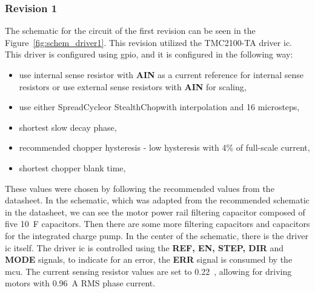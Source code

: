 \subsubsection{Revision 1}
The schematic for the circuit of the first revision can be seen in the Figure~\ref{fig:schem_driver1}.
This revision utilized the TMC2100-TA driver \acs{ic}.
This driver is configured using \acs{gpio}, and it is configured in the following way:
\begin{itemize}
    \item use internal sense resistor with \textbf{AIN} as a current reference for internal sense resistors or use external sense resistors with \textbf{AIN} for scaling,
    \item use either SpreadCycle\texttrademark or StealthChop\texttrademark with interpolation and 16 microsteps,
    \item shortest slow decay phase,
    \item recommended chopper hysteresis - low hysteresis with 4\% of full-scale current,
    \item shortest chopper blank time,
\end{itemize}
These values were chosen by following the recommended values from the datasheet.
In the schematic, which was adapted from the recommended schematic in the datasheet\cite{trinamic_tmc2100-datasheet_2018}, we can see the motor power rail filtering capacitor composed of five 10~\textmu F capacitors.
Then there are some more filtering capacitors and capacitors for the integrated charge pump.
In the center of the schematic, there is the driver \acs{ic} itself.
The driver \acs{ic} is controlled using the \textbf{REF, EN, STEP, DIR} and \textbf{MODE} signals, to indicate for an error, the \textbf{ERR} signal is consumed by the \acs{mcu}.
The current sensing resistor values are set to 0.22~\textohm, allowing for driving motors with 0.96~A RMS phase current.

